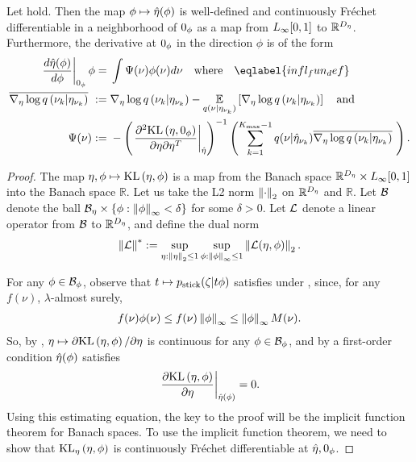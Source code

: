 \begin{thm}
%
Let  hold. Then the map $\phi \mapsto
\hat\eta(\phi)$ is well-defined and continuously Fr{\'e}chet differentiable in a
neighborhood of $0_\phi$ as a map from ${L_{\infty}[0,1]}$ to $\mathbb{R}^{D_{\eta}}$.
Furthermore, the derivative at $0_\phi$ in the direction $\phi$ is of the form
%
\begin{align}
%
\fracat{d \etaopt(\phi)}{d\phi}{\phiz} \phi ={}&
    \int \infl(\nu) \phi(\nu) d\nu \mathtxt{where} \eqlabel{infl_fun_def}\\
%
\lqgradbar{\nuk \vert \etanuk} :={}&
    \lqgrad{\nuk \vert \etanuk} -
    \expect{\q(\nu \vert \etanuk)}{\lqgrad{\nuk \vert \etanuk}}
    \mathand \nonumber\\
\infl(\nu) :={}&
-\left(\fracat{\partial^2 \KL{\eta, \phiz}}
                {\partial \eta \partial \eta^T}
                {\etaopt}\right)^{-1}
\left(
    \sumkm
    \q(\nu \vert \etaoptnuk) \lqgradbar{\nuk \vert \etanuk}
\right). \nonumber
%
\end{align}
%

%

\begin{proof}
%
The map $\eta, \phi \mapsto \mathrm{KL}\left(\eta, \phi\right)$ is a map from the Banach space
$\mathbb{R}^{D_{\eta}} \times {L_{\infty}[0,1]}$ into the Banach space $\mathbb{R}$. Let us
take the L2 norm $\left\Vert\cdot\right\Vert_2$ on $\mathbb{R}^{{D_{\eta}}}$ and $\mathbb{R}$.
Let $\mathcal{B}$ denote the ball $\mathcal{B}_\eta \times \{ \phi: \left\Vert\phi\right\Vert_{\infty} <
\delta\}$ for some $\delta > 0$.  Let $\mathcal{L}$ denote a linear operator from
$\mathcal{B}$ to $\mathbb{R}^{D_{\eta}}$, and define the dual norm
%
\begin{align*}
%
\norm{\linop}^* :=
    \sup_{\eta: \norm{\eta}_2 \le 1} \sup_{\phi: \norminf{\phi} \le 1}
     \norm{\linop(\eta, \phi)}_2.
%
\end{align*}

For any $\phi \in \mathcal{B}_\phi$, observe that $t \mapsto p_{\mathrm{stick}}(\zeta \vert t
\phi)$ satisfies  under ,
since, for any $f(\nu)$, $\lambda$-almost surely,
%
\begin{align*}
%
f(\nu) \phi(\nu) \le f(\nu) \norminf{\phi} \le \norminf{\phi} M(\nu).
%
\end{align*}
%
So, by , $\eta \mapsto \partial \mathrm{KL}\left(\eta, \phi\right) /
\partial \eta$ is continuous for any $\phi \in \mathcal{B}_\phi$, and by a first-order
condition $\hat\eta(\phi)$ satisfies
%
\begin{align*}
%
\fracat{\partial \KL{\eta, \phi}}
                {\partial \eta}
                {\etaopt(\phi)} = 0.
%
\end{align*}
%
Using this estimating equation, the key to the proof will be the implicit
function theorem for Banach spaces. To use the implicit function theorem, we
need to show that $\mathrm{KL}_{\eta}\left(\eta, \phi\right)$ is continuously Fr{\'e}chet
differentiable at $\hat\eta, 0_\phi$.


\end{proof}
\end{thm}
